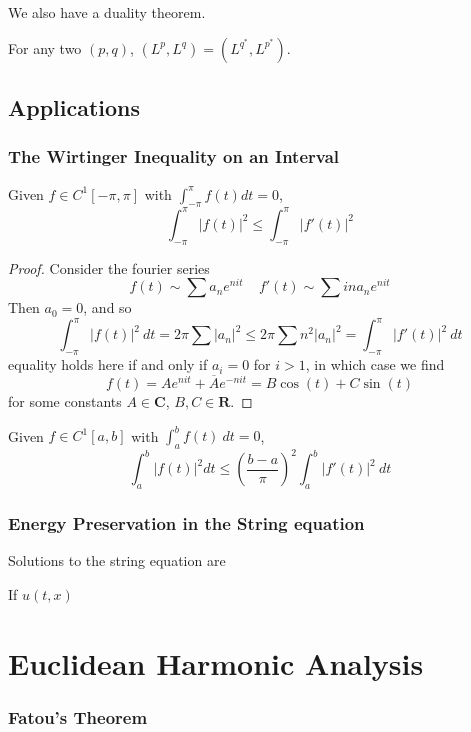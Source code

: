 We also have a duality theorem.

\begin{theorem}
	For any two $(p,q)$, $(L^p,L^q) = (L^{q^*}, L^{p^*})$.
\end{theorem}

\chapter{Applications}

\section{The Wirtinger Inequality on an Interval}

\begin{theorem}
    Given $f \in C^1[-\pi,\pi]$ with $\int_{-\pi}^\pi f(t) dt = 0$,
    \[ \int_{-\pi}^\pi |f(t)|^2 \leq \int_{-\pi}^\pi |f'(t)|^2 \]
\end{theorem}
\begin{proof}
    Consider the fourier series
    \[ f(t) \sim \sum a_n e^{nit}\ \ \ \ \ f'(t) \sim \sum in a_n e^{nit} \]
    Then $a_0 = 0$, and so
    \[ \int_{-\pi}^\pi |f(t)|^2\ dt = 2 \pi \sum |a_n|^2 \leq 2 \pi \sum n^2 |a_n|^2 = \int_{-\pi}^\pi |f'(t)|^2\ dt \]
    equality holds here if and only if $a_i = 0$ for $i > 1$, in which case we find
    \[ f(t) = A e^{nit} + \overline{A} e^{-nit} = B \cos(t) + C \sin(t) \]
    for some constants $A \in \mathbf{C}$, $B,C \in \mathbf{R}$.
\end{proof}

\begin{corollary}
    Given $f \in C^1[a,b]$ with $\int_a^b f(t)\ dt = 0$,
    \[ \int_a^b |f(t)|^2 dt \leq \left(\frac{b-a}{\pi}\right)^2 \int_a^b |f'(t)|^2\ dt \]
\end{corollary}

\section{Energy Preservation in the String equation}

Solutions to the string equation are

If $u(t,x)$

\part{Euclidean Harmonic Analysis}

\section{Fatou's Theorem}

